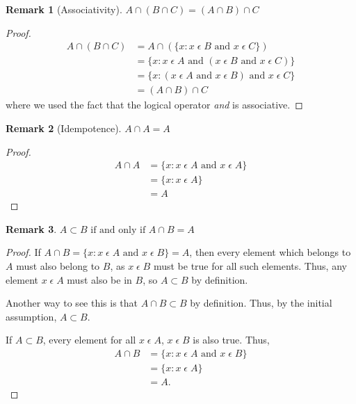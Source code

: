 \documentclass[12pt]{article}
\newtheorem{remark}{Remark}
\begin{document}
\begin{remark}[Associativity]
    $A \cap (B \cap C) = (A \cap B) \cap C$
\end{remark}
\begin{proof}
    \begin{align*}
        A \cap (B \cap C) &= A \cap (\{x: x\;\epsilon\;B \text{ and } x\;\epsilon\;C\})\\
                          &= \{x: x\;\epsilon\;A \text{ and } (x\;\epsilon\;B \text{ and } x\;\epsilon\;C)\}\\
                          &= \{x: (x\;\epsilon\;A \text{ and } x\;\epsilon\;B) \text{ and } x\;\epsilon\;C\}\\
                          &= (A \cap B) \cap C
    \end{align*}
    where we used the fact that the logical operator \textit{and} is associative.
\end{proof}

\begin{remark}[Idempotence]
    $A \cap A = A$
\end{remark}
\begin{proof}
    \begin{align*}
        A \cap A &= \{x: x\;\epsilon\;A \text{ and } x\;\epsilon\;A\}\\
                 &= \{x: x\;\epsilon\;A\}\\
                 &= A
    \end{align*}
\end{proof}

\begin{remark}
    $A \subset B \text{ if and only if } A \cap B = A$
\end{remark}
\begin{proof}
    If $A \cap B = \{x: x\;\epsilon\;A\text{ and } x\;\epsilon\;B\} = A$, then every element
    which belongs to $A$ must also belong to $B$, as $x\;\epsilon\;B$ must be true for all such elements.
    Thus, any element $x\;\epsilon\;A$ must also be in $B$, so $A \subset B$ by definition.

    Another way to see this is that $A \cap B \subset B$ by definition. Thus, by the initial assumption, $A \subset B$.

    If $A\subset B$, every element for all $x\;\epsilon\;A$, $x\;\epsilon\;B$ is also true. Thus,
    \begin{align*}
        A \cap B &= \{x: x\;\epsilon\;A\text{ and } x\;\epsilon\;B\}\\
                 &= \{x: x\;\epsilon\;A\}\\
                 &= A.
    \end{align*}
\end{proof}
\end{document}
